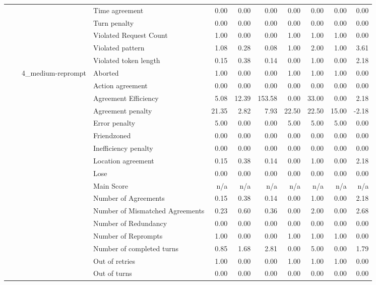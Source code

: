 \begin{tabular}{llllrrrrrrr}
 &  &  & Time agreement & 0.00 & 0.00 & 0.00 & 0.00 & 0.00 & 0.00 & 0.00 \\
 &  &  & Turn penalty & 0.00 & 0.00 & 0.00 & 0.00 & 0.00 & 0.00 & 0.00 \\
 &  &  & Violated Request Count & 1.00 & 0.00 & 0.00 & 1.00 & 1.00 & 1.00 & 0.00 \\
 &  &  & Violated pattern & 1.08 & 0.28 & 0.08 & 1.00 & 2.00 & 1.00 & 3.61 \\
 &  &  & Violated token length & 0.15 & 0.38 & 0.14 & 0.00 & 1.00 & 0.00 & 2.18 \\
\cline{3-11}
 &  & \multirow[t]{27}{*}{4_medium-reprompt} & Aborted & 1.00 & 0.00 & 0.00 & 1.00 & 1.00 & 1.00 & 0.00 \\
 &  &  & Action agreement & 0.00 & 0.00 & 0.00 & 0.00 & 0.00 & 0.00 & 0.00 \\
 &  &  & Agreement Efficiency & 5.08 & 12.39 & 153.58 & 0.00 & 33.00 & 0.00 & 2.18 \\
 &  &  & Agreement penalty & 21.35 & 2.82 & 7.93 & 22.50 & 22.50 & 15.00 & -2.18 \\
 &  &  & Error penalty & 5.00 & 0.00 & 0.00 & 5.00 & 5.00 & 5.00 & 0.00 \\
 &  &  & Friendzoned & 0.00 & 0.00 & 0.00 & 0.00 & 0.00 & 0.00 & 0.00 \\
 &  &  & Inefficiency penalty & 0.00 & 0.00 & 0.00 & 0.00 & 0.00 & 0.00 & 0.00 \\
 &  &  & Location agreement & 0.15 & 0.38 & 0.14 & 0.00 & 1.00 & 0.00 & 2.18 \\
 &  &  & Lose & 0.00 & 0.00 & 0.00 & 0.00 & 0.00 & 0.00 & 0.00 \\
 &  &  & Main Score & n/a & n/a & n/a & n/a & n/a & n/a & n/a \\
 &  &  & Number of Agreements & 0.15 & 0.38 & 0.14 & 0.00 & 1.00 & 0.00 & 2.18 \\
 &  &  & Number of Mismatched Agreements & 0.23 & 0.60 & 0.36 & 0.00 & 2.00 & 0.00 & 2.68 \\
 &  &  & Number of Redundancy & 0.00 & 0.00 & 0.00 & 0.00 & 0.00 & 0.00 & 0.00 \\
 &  &  & Number of Reprompts & 1.00 & 0.00 & 0.00 & 1.00 & 1.00 & 1.00 & 0.00 \\
 &  &  & Number of completed turns & 0.85 & 1.68 & 2.81 & 0.00 & 5.00 & 0.00 & 1.79 \\
 &  &  & Out of retries & 1.00 & 0.00 & 0.00 & 1.00 & 1.00 & 1.00 & 0.00 \\
 &  &  & Out of turns & 0.00 & 0.00 & 0.00 & 0.00 & 0.00 & 0.00 & 0.00 \\

\end{tabular}
